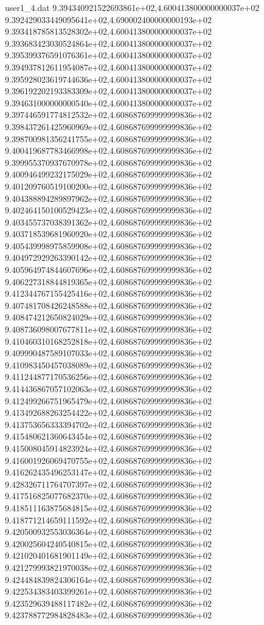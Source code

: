 \begin{filecontents}{user1_4.dat}
9.394340921522693861e+02,4.600413800000000037e+02
9.392429033449095641e+02,4.690002400000000193e+02
9.393418785813528302e+02,4.600413800000000037e+02
9.393683423030524864e+02,4.600413800000000037e+02
9.395399376591076361e+02,4.600413800000000037e+02
9.394937812611954087e+02,4.600413800000000037e+02
9.395928023619744636e+02,4.600413800000000037e+02
9.396192202193383309e+02,4.600413800000000037e+02
9.394631000000000540e+02,4.600413800000000037e+02
9.397446591774812532e+02,4.608687699999999836e+02
9.398437261425960969e+02,4.608687699999999836e+02
9.398700981356241755e+02,4.608687699999999836e+02
9.400419687783466998e+02,4.608687699999999836e+02
9.399955370937670978e+02,4.608687699999999836e+02
9.400946499232175029e+02,4.608687699999999836e+02
9.401209760519100200e+02,4.608687699999999836e+02
9.404388894289897962e+02,4.608687699999999836e+02
9.402464150100529423e+02,4.608687699999999836e+02
9.403455737038391362e+02,4.608687699999999836e+02
9.403718539681960920e+02,4.608687699999999836e+02
9.405439998975859908e+02,4.608687699999999836e+02
9.404972929263390142e+02,4.608687699999999836e+02
9.405964974844607696e+02,4.608687699999999836e+02
9.406227318844819365e+02,4.608687699999999836e+02
9.412344767155425416e+02,4.608687699999999836e+02
9.407481708426248588e+02,4.608687699999999836e+02
9.408474212650824029e+02,4.608687699999999836e+02
9.408736098007677811e+02,4.608687699999999836e+02
9.410460310168252818e+02,4.608687699999999836e+02
9.409990487589107033e+02,4.608687699999999836e+02
9.410983450457038089e+02,4.608687699999999836e+02
9.411244877170536256e+02,4.608687699999999836e+02
9.414436867057102063e+02,4.608687699999999836e+02
9.412499266751965479e+02,4.608687699999999836e+02
9.413492688263254422e+02,4.608687699999999836e+02
9.413753656333394702e+02,4.608687699999999836e+02
9.415480621360643454e+02,4.608687699999999836e+02
9.415008045914823924e+02,4.608687699999999836e+02
9.416001926069470755e+02,4.608687699999999836e+02
9.416262435496253147e+02,4.608687699999999836e+02
9.428326711764707397e+02,4.608687699999999836e+02
9.417516825077682370e+02,4.608687699999999836e+02
9.418511163875684815e+02,4.608687699999999836e+02
9.418771214659111592e+02,4.608687699999999836e+02
9.420500932553036364e+02,4.608687699999999836e+02
9.420025604240540815e+02,4.608687699999999836e+02
9.421020401681901149e+02,4.608687699999999836e+02
9.421279993821970038e+02,4.608687699999999836e+02
9.424484839824306164e+02,4.608687699999999836e+02
9.422534383403399261e+02,4.608687699999999836e+02
9.423529639488117482e+02,4.608687699999999836e+02
9.423788772984828483e+02,4.608687699999999836e+02

\end{filecontents}
